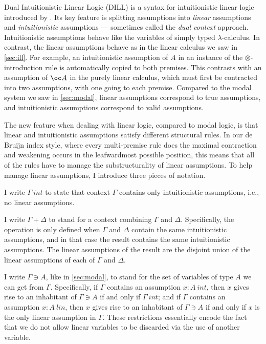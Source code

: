 Dual Intuitionistic Linear Logic (DILL) is a syntax for intuitionistic linear
logic introduced by \citet{Barber1996}.
Its key feature is splitting assumptions into \emph{linear} assumptions and
\emph{intuitionistic} assumptions --- sometimes called the \emph{dual context}
approach.
Intuitionistic assumptions behave like the variables of simply typed
$\lambda$-calculus.
In contrast, the linear assumptions behave as in the linear calculus we saw in
\cref{sec:ill}.
For example, an intuitionistic assumption of $A$ in an instance of the
$\otimes$-introduction rule is automatically copied to both premises.
This contrasts with an assumption of $\oc A$ in the purely linear calculus,
which must first
be contracted into two assumptions, with one going to each premise.
Compared to the modal system we saw in \cref{sec:modal}, linear assumptions
correspond to true assumptions, and intuitionistic assumptions correspond to
valid assumptions.

The new feature when dealing with linear logic, compared to modal logic, is that
linear and intuitionistic assumptions satisfy different structural rules.
In our de Bruijn index style, where every multi-premise rule does the maximal
contraction and weakening occurs in the leafwardmost possible position,
this means that all of the rules have to manage the substructurality of linear
assumptions.
To help manage linear assumptions, I introduce three pieces of notation.

\begin{definition}\label{def:DILL-empty}
  I write $\Gamma~\mathit{int}$ to state that context $\Gamma$ contains only
  intuitionistic assumptions, i.e., no linear assumptions.
\end{definition}

\begin{definition}\label{def:DILL-split}
  I write $\Gamma + \Delta$ to stand for a context combining $\Gamma$ and
  $\Delta$.
  Specifically, the operation is only defined when $\Gamma$ and $\Delta$ contain
  the same intuitionistic assumptions, and in that case the result contains the
  same intuitionistic assumptions.
  The linear assumptions of the result are the disjoint union of the linear
  assumptions of each of $\Gamma$ and $\Delta$.
\end{definition}

\begin{definition}\label{def:DILL-var}
  I write $\Gamma \ni A$, like in \cref{sec:modal}, to stand for the set of
  variables of type $A$ we can get from $\Gamma$.
  Specifically, if $\Gamma$ contains an assumption $x : A~\mathit{int}$, then
  $x$ gives rise to an inhabitant of $\Gamma \ni A$ if and only if
  $\Gamma~\mathit{int}$; and if $\Gamma$ contains an assumption
  $x : A~\mathit{lin}$, then $x$ gives rise to an inhabitant of $\Gamma \ni A$
  if and only if $x$ is the only linear assumption in $\Gamma$.
  These restrictions essentially encode the fact that we do not allow linear
  variables to be discarded via the use of another variable.
\end{definition}

